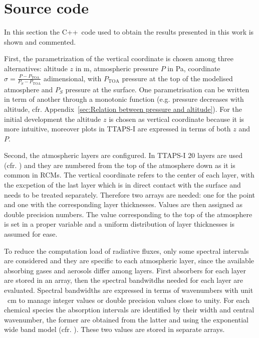 \documentclass[a4paper,10pt,final,twocolumn]{article}
\newcommand{\cpp}{C++}
\newcommand{\PTOA}{P_\text{TOA}}
\begin{document}
\newpage
\appendix

\section{Source code}
In this section the \cpp\ code used to obtain the results presented in this work is shown and commented.

First, the parametrization of the vertical coordinate is chosen among three alternatives: altitude $z$ in \unit{\metre}, atmospheric pressure $P$ in \unit{\pascal}, coordinate $\sigma = \frac{P - \PTOA}{P_S - \PTOA}$ adimensional, with $\PTOA$ pressure at the top of the modelised atmosphere and $P_S$ pressure at the surface. One parametrisation can be written in term of another through a monotonic function (e.g. pressure decreases with altitude, cfr. Appendix~\ref{sec:Relation between pressure and altitude}). For the initial development the altitude $z$ is chosen as vertical coordinate because it is more intuitive, moreover plots in TTAPS-I are expressed in terms of both $z$ and $P$.

Second, the atmospheric layers are configured. In TTAPS-I 20 layers are used (cfr. \cite[396]{NuclearWinterPhysics}) and they are numbered from the top of the atmosphere down as it is common in RCMs. The vertical coordinate refers to the center of each layer, with the excpetion of the last layer which is in direct contact with the surface and needs to be treated separately. %
Therefore two arrays are needed: one for the point and one with the corresponding layer thicknesses. Values are then assigned as double precision numbers. The value corresponding to the top of the atmosphere is set in a proper variable and a uniform distribution of layer thicknesses is assumed for ease.

To reduce the computation load of radiative fluxes, only some spectral intervals are considered and they are specific to each atmospheric layer, since the available absorbing gases and aerosols differ among layers. First absorbers for each layer are stored in an array, then the spectral bandwitdhs needed for each layer are evaluated. Spectral bandwidths are expressed in terms of wavenumbers with unit \unit{\per\centi\metre} to manage integer values or double precision values close to unity. For each chemical species the absorption intervals are identified by their width and central wavenumber, the former are obtained from the latter and using the exponential wide band model (cfr. \cite[360]{Modest}). These two values are stored in separate arrays.
\end{document}
